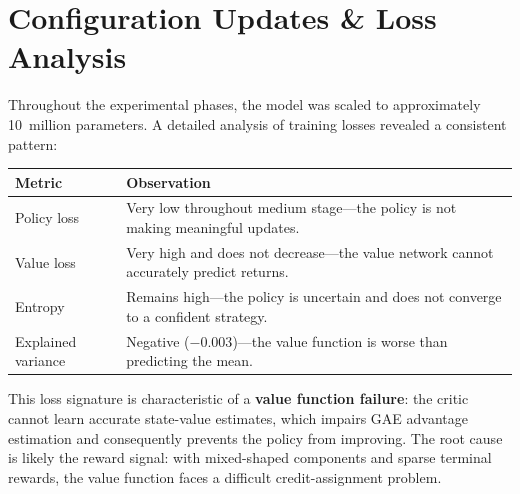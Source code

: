 \section{Configuration Updates \& Loss Analysis}

Throughout the experimental phases, the model was scaled to approximately
10~million parameters.  A detailed analysis of training losses revealed a
consistent pattern:

\begin{center}
\small
\begin{tabularx}{0.8\textwidth}{l X}
  \toprule
  \textbf{Metric} & \textbf{Observation} \\
  \midrule
  Policy loss  & Very low throughout medium stage---the policy is not
                 making meaningful updates. \\
  Value loss   & Very high and does not decrease---the value network cannot
                 accurately predict returns. \\
  Entropy      & Remains high---the policy is uncertain and does not converge
                 to a confident strategy. \\
  Explained variance & Negative ($-0.003$)---the value function is worse than
                 predicting the mean. \\
  \bottomrule
\end{tabularx}
\end{center}

This loss signature is characteristic of a \textbf{value function failure}: the
critic cannot learn accurate state-value estimates, which impairs GAE advantage
estimation and consequently prevents the policy from improving.  The root cause
is likely the reward signal: with mixed-shaped components and sparse terminal
rewards, the value function faces a difficult credit-assignment problem.


